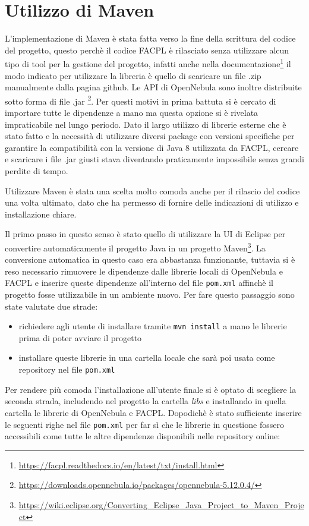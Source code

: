 \section{Utilizzo di Maven} \label{sec:maven}
L'implementazione di Maven\cite{maven} è stata fatta verso la fine della scrittura del codice del progetto, questo perchè il codice FACPL è rilasciato senza utilizzare alcun tipo di tool per la gestione del progetto, infatti anche nella documentazione\footnote{\url{https://facpl.readthedocs.io/en/latest/txt/install.html}} il modo indicato per utilizzare la libreria è quello di scaricare un file .zip manualmente dalla pagina github\cite{facpl-github}. Le API di OpenNebula sono inoltre distribuite sotto forma di file .jar \footnote{\url{https://downloads.opennebula.io/packages/opennebula-5.12.0.4/}}. Per questi motivi in prima battuta si è cercato di importare tutte le dipendenze a mano ma questa opzione si è rivelata impraticabile nel lungo periodo. Dato il largo utilizzo di librerie esterne che è stato fatto e la necessità di utilizzare diversi package con versioni specifiche per garantire la compatibilità con la versione di Java 8 utilizzata da FACPL, cercare e scaricare i file .jar giusti stava diventando praticamente impossibile senza grandi perdite di tempo.\par Utilizzare Maven è stata una scelta molto comoda anche per il rilascio del codice una volta ultimato, dato che ha permesso di fornire delle indicazioni di utilizzo e installazione chiare.\par
Il primo passo in questo senso è stato quello di utilizzare la UI di Eclipse per convertire automaticamente il progetto Java in un progetto Maven\footnote{\url{https://wiki.eclipse.org/Converting_Eclipse_Java_Project_to_Maven_Project}}. La conversione automatica in questo caso era abbastanza funzionante, tuttavia si è reso necessario rimuovere le dipendenze dalle librerie locali di OpenNebula e FACPL e inserire queste dipendenze all'interno del file \texttt{pom.xml} affinchè il progetto fosse utilizzabile in un ambiente nuovo. Per fare questo passaggio sono state valutate due strade:
\begin{itemize}
    \item richiedere agli utente di installare tramite \texttt{mvn install} a mano le librerie prima di poter avviare il progetto
    \item installare queste librerie in una cartella locale che sarà poi usata come repository nel file \texttt{pom.xml}
\end{itemize}
Per rendere più comoda l'installazione all'utente finale si è optato di scegliere la seconda strada, includendo nel progetto la cartella \emph{libs} e installando in quella cartella le librerie di OpenNebula e FACPL. Dopodichè è stato sufficiente inserire le seguenti righe nel file \texttt{pom.xml} per far sì che le librerie in questione fossero accessibili come tutte le altre dipendenze disponibili nelle repository online:
